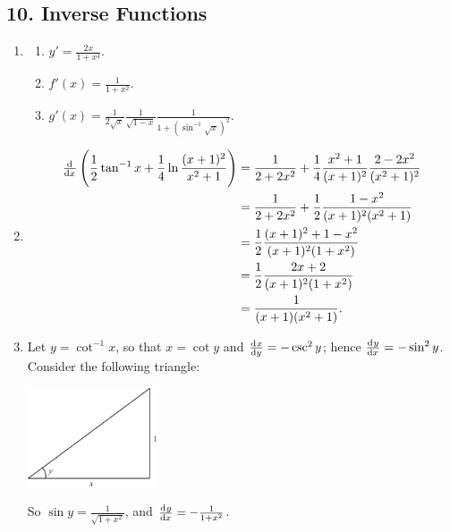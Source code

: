 \subsection*{10. Inverse Functions}
\begin{enumerate}
  \item
    \begin{enumerate}
      \item $ y' = \frac{2x}{1+x^4} $.
      \item $ f'(x) = \frac{1}{1+x^2} $.
      \item $ g'(x) = \frac{1}{2\sqrt{x}} \frac{1}{\sqrt{1 - x}} \frac{1}{1+(\sin^{-1} \sqrt{x})^2}  $.
    \end{enumerate}
  \item
    \begin{align*}
      \od{}{x} \left( \frac{1}{2} \tan^{-1} x + \frac{1}{4} \ln\frac{(x + 1)^2}{x^2 + 1} \right)
         &= \frac{1}{2 + 2x^2}  + \frac{1}{4} \frac{x^2 + 1}{(x + 1)^2} \frac{2-2x^2}{(x^2 + 1)^2}\\
         &= \frac{1}{2 + 2x^2}  + \frac{1}{2} \frac{1-x^2}{(x + 1)^2(x^2 + 1)}\\
         &= \frac{1}{2} \frac{(x + 1)^2 + 1 - x^2}{(x + 1)^2 (1 + x^2)}\\
         &= \frac{1}{2} \frac{2x + 2}{(x + 1)^2 (1 + x^2)}\\
         &= \frac{1}{(x + 1)(x^2 + 1)}.
    \end{align*}
  \item Let $ y = \cot^{-1} x $, so that $ x = \cot y $ and $ \od{x}{y} = -\csc^2 y $; hence $ \od{y}{x} = -\sin^2 y $.
        Consider the following triangle:
        \begin{center}
          \includegraphics[width=0.3\textwidth]{antitriangle2}
        \end{center}
        So $ \sin y = \frac{1}{\sqrt{1 + x^2}} $, and $ \od{y}{x} = -\frac{1}{1 + x^2} $.
\end{enumerate}

